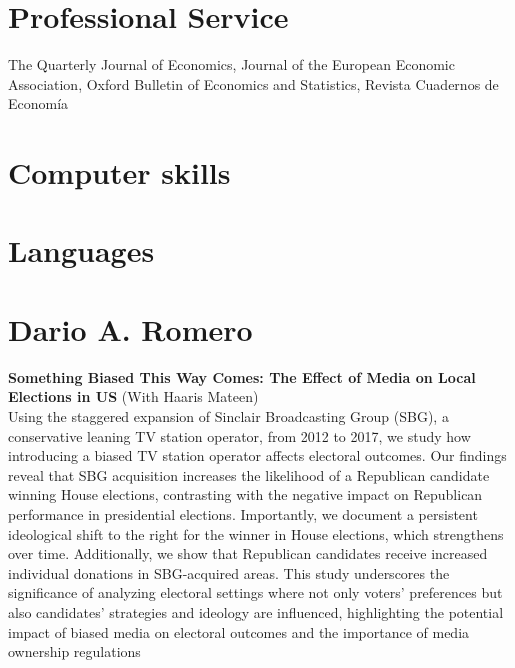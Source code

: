 \documentclass{moderncv}
\begin{document}
\section{\textbf{Professional Service}}
{The Quarterly Journal of Economics,  Journal of the European Economic Association,  Oxford Bulletin of Economics and Statistics, Revista Cuadernos de Econom\'ia \\ }


\section{\textbf{Computer skills}}
 {}{}

\section{\textbf{Languages}}

\pagebreak 
\section{\textbf{Dario A. Romero}}
{\textbf{Something Biased This Way Comes: The Effect of Media on Local Elections in US} (With Haaris Mateen) \\ }
{Using the staggered expansion of Sinclair Broadcasting Group (SBG), a conservative leaning TV station operator, from 2012 to 2017, we study how introducing a biased TV station operator affects electoral outcomes. Our findings reveal that SBG acquisition increases the likelihood of a Republican candidate winning House elections, contrasting with the negative impact on Republican performance in presidential elections. Importantly, we document a persistent ideological shift to the right for the winner in House elections, which strengthens over time. Additionally, we show that Republican candidates receive increased individual donations in SBG-acquired areas. This study underscores the significance of analyzing electoral settings where not only voters' preferences but also candidates' strategies and ideology are influenced, highlighting the potential impact of biased media on electoral outcomes and the importance of media ownership regulations\\} \vspace*{0.25cm}
\end{document}
